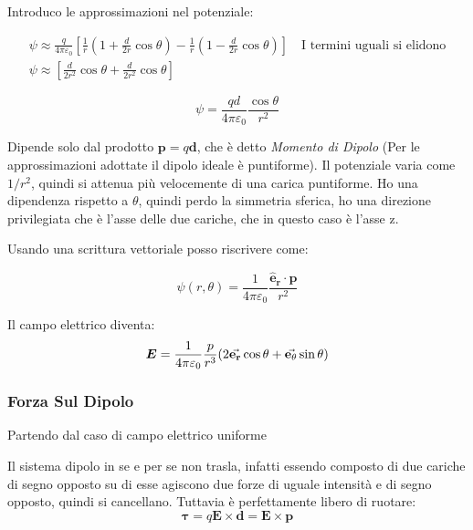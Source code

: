 \documentclass[a4paper]{scrarticle}
\begin{document}
Introduco le approssimazioni nel potenziale:

\begin{gather*}
    \psi \approx \frac{q}{4\pi\varepsilon_0}\left[\frac{1}{r}(1 + \frac{d}{2r}\cos \theta) - \frac{1}{r}(1 - \frac{d}{2r}\cos \theta)\right] \quad \text{I termini uguali si elidono}\\
    \psi \approx \left[\frac{d}{2r^2}\cos \theta + \frac{d}{2r^2}\cos \theta\right]
\end{gather*}

\begin{equation}
    \psi = \frac{qd}{4\pi\varepsilon_0}\frac{\cos\theta}{r^2}
\end{equation}

Dipende solo dal prodotto $\bm p = q \bm d$, che è detto \emph{Momento di Dipolo} (Per le approssimazioni adottate il dipolo ideale è puntiforme).
Il potenziale varia come $1/r^2$, quindi si attenua più velocemente di una carica puntiforme.
Ho una dipendenza rispetto a $\theta$, quindi perdo la simmetria sferica, ho una direzione privilegiata che è l'asse delle due cariche, che in questo caso è l'asse z.

Usando una scrittura vettoriale posso riscrivere come:

\begin{equation}
    \psi(r, \theta) = \frac{1}{4 \pi \varepsilon_0} \frac{\bm{\hat e_r} \cdot \bm p}{r^2}
\end{equation}

Il campo elettrico diventa:
\begin{equation}
    \bm E = \frac{1}{4\pi\varepsilon_0} \frac{p}{r^3} (2 \va{ e_r}\cos \theta + \va{ e_\theta} \sin\theta )
\end{equation}

\subsubsection*{Forza Sul Dipolo}

Partendo dal caso di campo elettrico uniforme

Il sistema dipolo in se e per se non trasla, infatti essendo composto di due cariche di segno opposto su di esse agiscono due forze di uguale intensità e di segno opposto, quindi si cancellano. Tuttavia è perfettamente libero di ruotare:
\begin{equation}
    \bm \tau = q \bm E \times \bm d = \bm E \times \bm p
\end{equation}
\end{document}
